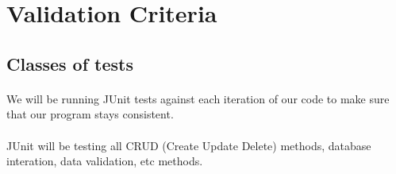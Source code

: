 \documentclass{article}
\begin{document}


\section{Validation Criteria}

\subsection{Classes of tests}
\paragraph{}
We will be running JUnit tests against each iteration of our code to make sure that our program stays consistent.

\paragraph{}
JUnit will be testing all CRUD (Create Update Delete) methods, database interation, data validation, etc methods.



\end{document}
